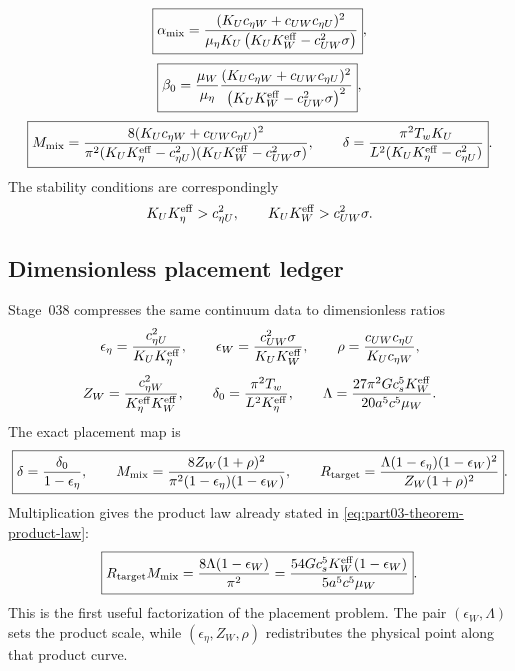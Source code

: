 \begin{equation}
\label{eq:part03-stage20-alpha-beta}
\boxed{
\alpha_{\rm mix}
=\frac{(K_Uc_{\eta W}+c_{UW}c_{\eta U})^2}
{\mu_\eta K_U\left(K_UK_W^{\rm eff}-c_{UW}^2\sigma\right)}},
\end{equation}
\begin{equation}
\label{eq:part03-stage20-beta0}
\boxed{
\beta_0
=\frac{\mu_W}{\mu_\eta}
\frac{(K_Uc_{\eta W}+c_{UW}c_{\eta U})^2}
{\left(K_UK_W^{\rm eff}-c_{UW}^2\sigma\right)^2}},
\end{equation}
\begin{equation}
\label{eq:part03-stage20-Mmix-delta}
\boxed{
M_{\rm mix}
=\frac{8(K_Uc_{\eta W}+c_{UW}c_{\eta U})^2}
{\pi^2(K_UK_\eta^{\rm eff}-c_{\eta U}^2)(K_UK_W^{\rm eff}-c_{UW}^2\sigma)},
\qquad
\delta=\frac{\pi^2T_wK_U}{L^2(K_UK_\eta^{\rm eff}-c_{\eta U}^2)}}.
\end{equation}
The stability conditions are correspondingly
\begin{equation}
\label{eq:part03-stage20-stability}
K_UK_\eta^{\rm eff}>c_{\eta U}^2,
\qquad
K_UK_W^{\rm eff}>c_{UW}^2\sigma.
\end{equation}

\subsection{Dimensionless placement ledger}
\label{subsec:part03-dimensionless-placement}

Stage~038 compresses the same continuum data to dimensionless ratios
\begin{equation}
\label{eq:part03-stage21-ratios}
\epsilon_\eta=\frac{c_{\eta U}^2}{K_UK_\eta^{\rm eff}},
\qquad
\epsilon_W=\frac{c_{UW}^2\sigma}{K_UK_W^{\rm eff}},
\qquad
\rho=\frac{c_{UW}c_{\eta U}}{K_Uc_{\eta W}},
\end{equation}
\begin{equation}
\label{eq:part03-stage21-ratios-b}
Z_W=\frac{c_{\eta W}^2}{K_\eta^{\rm eff}K_W^{\rm eff}},
\qquad
\delta_0=\frac{\pi^2T_w}{L^2K_\eta^{\rm eff}},
\qquad
\Lambda=\frac{27\pi^2Gc_s^5K_W^{\rm eff}}{20a^5c^5\mu_W}.
\end{equation}
The exact placement map is
\begin{equation}
\label{eq:part03-stage21-placement}
\boxed{
\delta=\frac{\delta_0}{1-\epsilon_\eta},
\qquad
M_{\rm mix}=\frac{8Z_W(1+\rho)^2}{\pi^2(1-\epsilon_\eta)(1-\epsilon_W)},
\qquad
R_{\rm target}=\frac{\Lambda(1-\epsilon_\eta)(1-\epsilon_W)^2}{Z_W(1+\rho)^2}}.
\end{equation}
Multiplication gives the product law already stated in \eqref{eq:part03-theorem-product-law}:
\begin{equation}
\label{eq:part03-stage21-product}
\boxed{
R_{\rm target}M_{\rm mix}
=\frac{8\Lambda(1-\epsilon_W)}{\pi^2}
=\frac{54Gc_s^5K_W^{\rm eff}(1-\epsilon_W)}{5a^5c^5\mu_W}}.
\end{equation}
This is the first useful factorization of the placement problem.  The pair \((\epsilon_W,\Lambda)\) sets the product scale, while \((\epsilon_\eta,Z_W,\rho)\) redistributes the physical point along that product curve.

